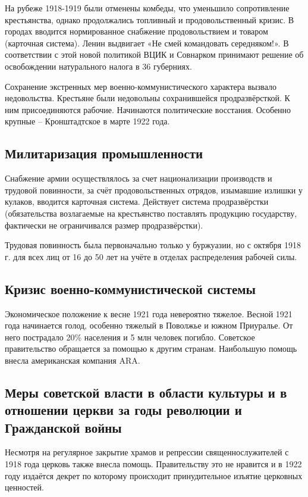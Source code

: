На рубеже 1918-1919 были отменены комбеды, что уменьшило сопротивление крестьянства, однако продолжались топливный и продовольственный кризис. В городах вводится нормированное снабжение продовольствием и товаром (карточная система). Ленин выдвигает «Не смей командовать середняком!». В соответствии с этой новой политикой ВЦИК и Совнарком принимают решение об освобождении натурального налога в 36 губерниях.

Сохранение экстренных мер военно-коммунистического характера вызвало недовольства. Крестьяне были недовольны сохранившейся продразвёрсткой. К ним присоединяются рабочие. Начинаются политические восстания. Особенно крупные – Кронштадтское в марте 1922 года.

\subsection{Милитаризация промышленности}

Снабжение армии осуществлялось за счет национализации производств и трудовой повинности, за счёт продовольственных отрядов, изымавшие излишки у кулаков, вводится карточная система. Действует система продразвёрстки (обязательства возлагаемые на крестьянство поставлять продукцию государству, фактически не ограничивался размер продразвёрстки).

Трудовая повинность была первоначально только у буржуазии, но с октября 1918 г. для всех лиц от 16 до 50 лет на учёте в отделах распределения рабочей силы.

\subsection{Кризис военно-коммунистической системы}
Экономическое положение к весне 1921 года невероятно тяжелое. Весной 1921 года начинается голод, особенно тяжелый в Поволжье и южном Приуралье. От него пострадало 20\% населения и 5 млн человек погибло. Советское правительство обращается за помощью к другим странам. Наибольшую помощь внесла американская компания ARA.

\subsection{Меры советской власти в области культуры и в отношении церкви за годы революции и Гражданской войны}

Несмотря на регулярное закрытие храмов и репрессии священнослужителей с 1918 года церковь также внесла помощь. Правительству это не нравится и в 1922 году издаётся декрет по которому происходит принудительное изъятие церковных ценностей.

